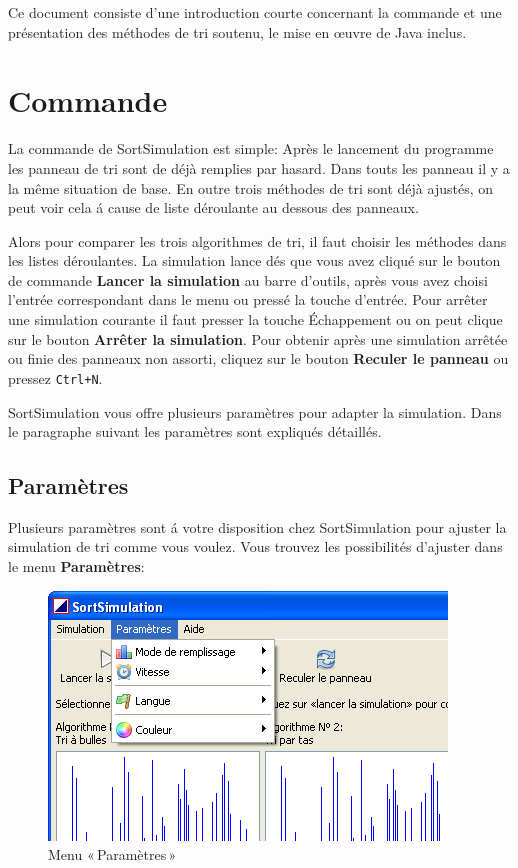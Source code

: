 \documentclass[11pt, a4paper, titlepage, twoside]{article}
\renewcommand{\emph}{\textbf}
\begin{document}
	Ce document consiste d’une introduction courte concernant la commande et une présentation des méthodes de tri soutenu, le mise en œuvre de Java inclus.
	
	\section{Commande}
	
	La commande de SortSimulation est simple: Après le lancement du programme les panneau de tri sont de déjà remplies par hasard. Dans touts les panneau il y a la même situation de base. En outre trois méthodes de tri sont déjà ajustés, on peut voir cela á cause de liste déroulante au dessous des panneaux.
	
	Alors pour comparer les trois algorithmes de tri, il faut choisir les méthodes dans les listes déroulantes. La simulation lance dés que vous avez cliqué sur le bouton de commande \emph{Lancer la simulation} au barre d'outils, après vous avez choisi l'entrée correspondant dans le menu ou pressé la touche d'entrée. Pour arrêter une simulation courante il faut presser la touche Échappement ou on peut clique sur le bouton \emph{Arrêter la simulation}. Pour obtenir après une simulation arrêtée ou finie des panneaux non assorti, cliquez sur le bouton \emph{Reculer le panneau} ou pressez \texttt{Ctrl+N}.
	
	SortSimulation vous offre plusieurs paramètres pour adapter la simulation. Dans le paragraphe suivant les paramètres sont expliqués détaillés.
	
	\subsection{Paramètres}
	
	Plusieurs paramètres sont á votre disposition chez SortSimulation pour ajuster la simulation de tri comme vous voulez. Vous trouvez les possibilités d'ajuster dans le menu \emph{Paramètres}:
	
	\begin{figure}[h]
		\begin{center}
			\includegraphics[scale=0.6]{images/image1.png}
			\caption{Menu «\,Paramètres\,»}
		\end{center}
	\end{figure}
	
\end{document}

